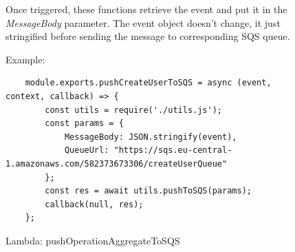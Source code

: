 \begin{figure} [H]
Once triggered, these functions retrieve the event and put it in the \emph{MessageBody} parameter. The event object doesn't change, it just stringified before sending the message to corresponding SQS queue.

Example:

\begin{lstlisting}
	module.exports.pushCreateUserToSQS = async (event, context, callback) => {
		const utils = require('./utils.js');
		const params = {
			MessageBody: JSON.stringify(event),
			QueueUrl: "https://sqs.eu-central-1.amazonaws.com/582373673306/createUserQueue"
		};
		const res = await utils.pushToSQS(params);
		callback(null, res);
	};
\end{lstlisting}
	\caption{Lambda: pushOperationAggregateToSQS}
\end{figure}

